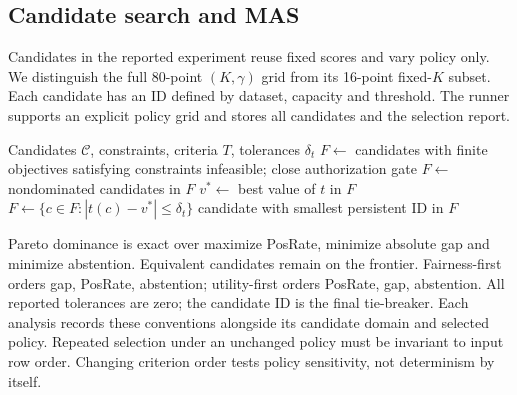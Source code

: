 \subsection{Candidate search and MAS}
Candidates in the reported experiment reuse fixed scores and vary policy only. We distinguish the full 80-point $(K,\gamma)$ grid from its 16-point fixed-$K$ subset. Each candidate has an ID defined by dataset, capacity and threshold. The runner supports an explicit policy grid and stores all candidates and the selection report.

\begin{algorithm}[t]
\caption{Empirical ECL--Pareto--MAS selection}
\label{alg:mas}
\begin{algorithmic}[1]
\Require Candidates $\mathcal C$, constraints, criteria $T$, tolerances $\delta_t$
\State $F\gets$ candidates with finite objectives satisfying constraints
\State \Return infeasible; close authorization gate
\EndIf
\State $F\gets$ nondominated candidates in $F$
\State $v^*\gets$ best value of $t$ in $F$
\State $F\gets\{c\in F:|t(c)-v^*|\leq\delta_t\}$
\EndFor
\State \Return candidate with smallest persistent ID in $F$
\end{algorithmic}
\end{algorithm}

Pareto dominance is exact over maximize PosRate, minimize absolute gap and minimize abstention. Equivalent candidates remain on the frontier. Fairness-first orders gap, PosRate, abstention; utility-first orders PosRate, gap, abstention. All reported tolerances are zero; the candidate ID is the final tie-breaker. Each analysis records these conventions alongside its candidate domain and selected policy. Repeated selection under an unchanged policy must be invariant to input row order. Changing criterion order tests policy sensitivity, not determinism by itself.
